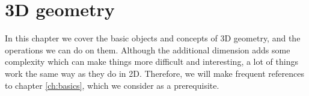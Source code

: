 \chapter{3D geometry}
In this chapter we cover the basic objects and concepts of 3D geometry, and the operations we can do on them. Although the additional dimension adds some complexity which can make things more difficult and interesting, a lot of things work the same way as they do in 2D. Therefore, we will make frequent references to chapter \ref{ch:basics}, which we consider as a prerequisite.







